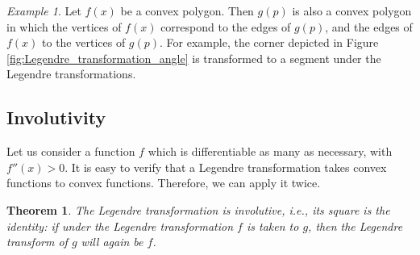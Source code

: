 \documentclass[leqno]{report}
\numberwithin{equation}{section}
\theoremstyle{plain}
\newtheorem*{thm*}{Theorem}
\theoremstyle{definition}
\theoremstyle{remark}
\theoremstyle{smallcap}
\newtheorem{ex}{Example}
\numberwithin{prob}{section}
\begin{document}
\begin{ex}
  Let $f(x)$ be a convex polygon.
  Then $g(p)$ is also a convex polygon in which
  the vertices of $f(x)$ correspond to the edges
  of $g(p)$, and the edges of $f(x)$
  to the vertices of $g(p)$.
  For example,
  the corner depicted in Figure \ref{fig:Legendre_transformation_angle}
  is transformed to a segment under
  the Legendre transformations.
\end{ex}


\subsection{Involutivity}

Let us consider a function $f$ which is differentiable
as many as necessary, with $f''(x) > 0$.
%
It is easy to verify that
a Legendre transformation
takes convex functions to convex functions.
Therefore, we can apply it twice.

\begin{thm*}
  The Legendre transformation is involutive,
  i.e., its square is the identity:
  if under the Legendre transformation $f$
  is taken to $g$, then the Legendre transform
  of $g$ will again be $f$.
\end{thm*}
\end{document}
